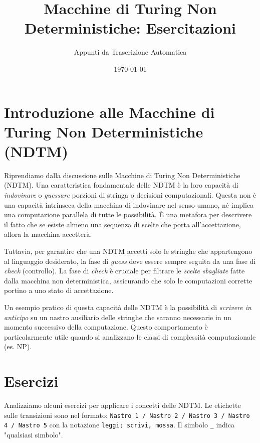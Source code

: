 \documentclass[a4paper]{article}
\title{Macchine di Turing Non Deterministiche: Esercitazioni}
\author{Appunti da Trascrizione Automatica}
\date{\today}
\begin{document}


\maketitle
\tableofcontents
\newpage

\section{Introduzione alle Macchine di Turing Non Deterministiche (NDTM)}

Riprendiamo dalla discussione sulle Macchine di Turing Non Deterministiche (NDTM).
Una caratteristica fondamentale delle NDTM è la loro capacità di \textit{indovinare} o \textit{guessare} porzioni di stringa o decisioni computazionali. Questa non è una capacità intrinseca della macchina di indovinare nel senso umano, né implica una computazione parallela di tutte le possibilità. È una metafora per descrivere il fatto che se esiste almeno una sequenza di scelte che porta all'accettazione, allora la macchina accetterà.

Tuttavia, per garantire che una NDTM accetti solo le stringhe che appartengono al linguaggio desiderato, la fase di \textit{guess} deve essere sempre seguita da una fase di \textit{check} (controllo). La fase di \textit{check} è cruciale per filtrare le \textit{scelte sbagliate} fatte dalla macchina non deterministica, assicurando che solo le computazioni corrette portino a uno stato di accettazione.

Un esempio pratico di questa capacità delle NDTM è la possibilità di \textit{scrivere in anticipo} su un nastro ausiliario delle stringhe che saranno necessarie in un momento successivo della computazione. Questo comportamento è particolarmente utile quando si analizzano le classi di complessità computazionale (es. NP).

\section{Esercizi}

Analizziamo alcuni esercizi per applicare i concetti delle NDTM. Le etichette sulle transizioni sono nel formato:
\texttt{Nastro 1 / Nastro 2 / Nastro 3 / Nastro 4 / Nastro 5}
con la notazione \texttt{leggi; scrivi, mossa}. Il simbolo \texttt{\_} indica "qualsiasi simbolo".
\end{document}

